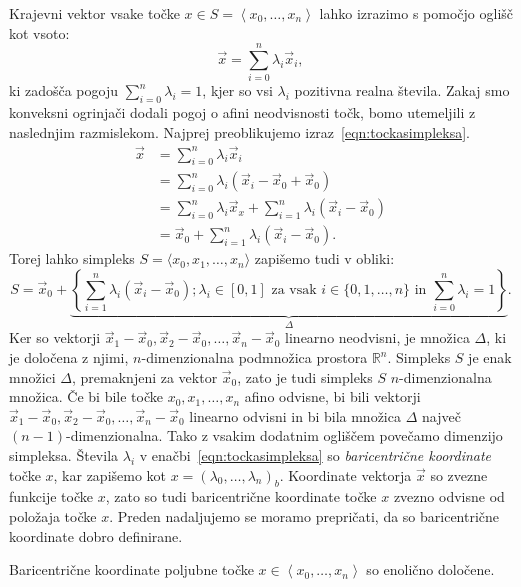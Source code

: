 \documentclass[mat1]{fmfdelo}
\newcommand{\R}{\mathbb R}
\newcommand{\0}{\underline{0}}
\begin{document}
Krajevni vektor vsake točke $x \in S = \left < x_0, \dots, x_n \right >$ lahko izrazimo s pomočjo oglišč kot vsoto:
\begin{equation}\label{eqn:tockasimpleksa}
\vec{x} = \sum\limits_{i=0}^n \lambda_i \vec{x}_i,
\end{equation}
ki zadošča pogoju $\sum\limits_{i=0}^n \lambda_i = 1$, kjer so vsi $\lambda_i$ pozitivna realna števila. Zakaj smo konveksni ogrinjači dodali pogoj o afini neodvisnosti točk, bomo utemeljili z naslednjim razmislekom. Najprej preoblikujemo izraz~\eqref{eqn:tockasimpleksa}. 
\begin{align*}
\vec{x} &= \sum\limits_{i=0}^n \lambda_i \vec{x}_i \\
&= \sum\limits_{i=0}^n \lambda_i (\vec{x}_i - \vec{x}_0 + \vec{x}_0) \\
&= \sum\limits_{i=0}^n \lambda_i \vec{x}_x + \sum\limits_{i=1}^n \lambda_i (\vec{x}_i - \vec{x}_0) \\
&= \vec{x}_0 + \sum\limits_{i=1}^n \lambda_i (\vec{x}_i - \vec{x}_0).
\end{align*}
Torej lahko simpleks $S = \langle x_0, x_1, \dots, x_n \rangle$ zapišemo tudi v obliki:
$$S = \vec{x}_0 + \underbrace{\left \{ \sum\limits_{i=1}^n \lambda_i (\vec{x}_i - \vec{x}_0); \lambda_i \in [0, 1] \text{ za vsak } i \in \{0, 1, \dots, n \} \text{ in } \sum\limits_{i=0}^n \lambda_i = 1  \right \}}_{\Delta}.$$
Ker so vektorji $\vec{x}_1 - \vec{x}_0, \vec{x}_2 - \vec{x}_0, \dots, \vec{x}_n - \vec{x}_0$ linearno neodvisni, je množica $\Delta$, ki je določena z njimi, $n$-dimenzionalna podmnožica prostora $\R^n$. Simpleks $S$ je enak množici $\Delta$, premaknjeni za vektor $\vec{x}_0$, zato je tudi simpleks $S$ $n$-dimenzionalna množica. Če bi bile točke $x_0, x_1, \dots, x_n$ afino odvisne, bi bili vektorji $\vec{x}_1 - \vec{x}_0, \vec{x}_2 - \vec{x}_0, \dots, \vec{x}_n - \vec{x}_0$ linearno odvisni in bi bila množica $\Delta$ največ $(n-1)$-dimenzionalna. Tako z vsakim dodatnim ogliščem povečamo dimenzijo simpleksa.
Števila $\lambda_i$ v enačbi~\eqref{eqn:tockasimpleksa} so \emph{baricentrične koordinate} točke $x$, kar zapišemo kot $x = (\lambda_0, \dots, \lambda_n)_b$. Koordinate vektorja $\vec{x}$ so zvezne funkcije točke $x$, zato so tudi baricentrične koordinate točke $x$ zvezno odvisne od položaja točke $x$. Preden nadaljujemo se moramo prepričati, da so baricentrične koordinate dobro definirane.
\begin{trditev}\label{trd:zveznost-baricentra}
Baricentrične koordinate poljubne točke $x \in \left <x_0, \dots, x_n \right >$ so enolično določene.
\end{trditev}
\end{document}
